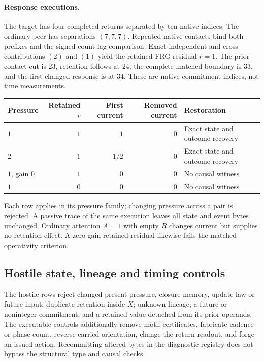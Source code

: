 \paragraph{Response executions.}
The target has four completed returns separated by ten native indices. The
ordinary peer has separations \((7,7,7)\). Repeated native contacts bind both
prefixes and the signed count-lag comparison. Exact independent and cross
contributions \((2)\) and \((1)\) yield the retained FRG residual \(r=1\).
The prior contact cut is \(23\), retention follows at \(24\), the complete
matched boundary is \(33\), and the first changed response is at \(34\).
These are native commitment indices, not time measurements.

\begin{center}
\begin{tabular}{lrrrl}
\toprule Pressure & Retained \(r\) & First current & Removed current & Restoration\\\midrule
\(1\) & \(1\) & \(1\) & \(0\) & Exact state and outcome recovery\\
\(2\) & \(1\) & \(1/2\) & \(0\) & Exact state and outcome recovery\\
\(1\), gain \(0\) & \(1\) & \(0\) & \(0\) & No causal witness\\
\(1\) & \(0\) & \(0\) & \(0\) & No causal witness\\
\bottomrule
\end{tabular}
\end{center}
Each row applies  in its pressure family;
changing pressure across a pair is rejected. A passive trace of the
same execution leaves all state and event bytes unchanged. Ordinary attention
\(A=1\) with empty \(R\) changes current but supplies no retention effect.
A zero-gain retained residual likewise fails the matched operativity criterion.

\subsection{Hostile state, lineage and timing controls}
\label{sec:m2-hostile}
\label{man:temporal-awareness-controls}
The hostile rows reject changed present pressure, closure memory, update law
or future input; duplicate retention inside \(X\); unknown lineage; a
future or noninteger commitment; and a retained value detached from its
prior operands. The executable controls additionally remove motif
certificates, fabricate cadence or phase count, reverse carried orientation,
change the return readout, and forge an issued action. Recommitting altered
bytes in the diagnostic registry does not bypass the structural type and
causal checks.

